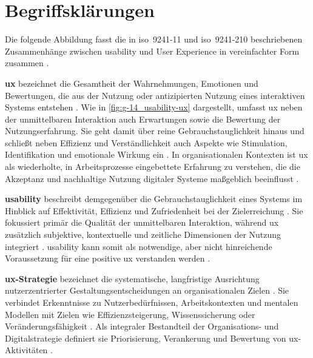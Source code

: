 \section{Begriffsklärungen}
\label{sec:02-01_definitions-and-concepts}

Die folgende Abbildung fasst die in \acrshort{iso}~9241-11 und \acrshort{iso}~9241-210 beschriebenen Zusammenhänge zwischen \Gls{usability} und User Experience in vereinfachter Form zusammen \cite{501:ISO9241-11,500:ISO9241-210}.


\textbf{\acrlong{ux}} bezeichnet die Gesamtheit der Wahrnehmungen, Emotionen und Bewertungen, die aus der Nutzung oder antizipierten Nutzung eines interaktiven Systems entstehen \cite{500:ISO9241-210}. Wie in \autoref{fig:g-14_usability-ux} dargestellt, umfasst \Gls{ux} neben der unmittelbaren Interaktion auch Erwartungen sowie die Bewertung der Nutzungserfahrung. Sie geht damit über reine Gebrauchstauglichkeit hinaus und schließt neben Effizienz und Verständlichkeit auch Aspekte wie Stimulation, Identifikation und emotionale Wirkung ein \cite{408:Hassenzahl2010,906:HassenzahlUXED}.
In organisationalen Kontexten ist \Gls{ux} als wiederholte, in Arbeitsprozesse eingebettete Erfahrung zu verstehen, die die Akzeptanz und nachhaltige Nutzung digitaler Systeme maßgeblich beeinflusst \cite{408:Hassenzahl2010,906:HassenzahlUXED}.

\textbf{\Gls{usability}} beschreibt demgegenüber die Gebrauchstauglichkeit eines Systems im Hinblick auf Effektivität, Effizienz und Zufriedenheit bei der Zielerreichung \cite{501:ISO9241-11}. Sie fokussiert primär die Qualität der unmittelbaren Interaktion, während \Gls{ux} zusätzlich subjektive, kontextuelle und zeitliche Dimensionen der Nutzung integriert \cite{500:ISO9241-210}. \Gls{usability} kann somit als notwendige, aber nicht hinreichende Voraussetzung für eine positive \Gls{ux} verstanden werden \cite{501:ISO9241-11}.

\textbf{\Gls{ux}-Strategie} bezeichnet die systematische, langfristige Ausrichtung nutzerzentrierter Gestaltungsentscheidungen an organisationalen Zielen \cite{406:Albers2015}. Sie verbindet Erkenntnisse zu Nutzerbedürfnissen, Arbeitskontexten und mentalen Modellen mit Zielen wie Effizienzsteigerung, Wissenssicherung oder Veränderungsfähigkeit \cite{406:Albers2015,407:Levy2015}. Als integraler Bestandteil der Organisations- und Digitalstrategie definiert sie Priorisierung, Verankerung und Bewertung von \Gls{ux}-Aktivitäten \cite{406:Albers2015,407:Levy2015}.

